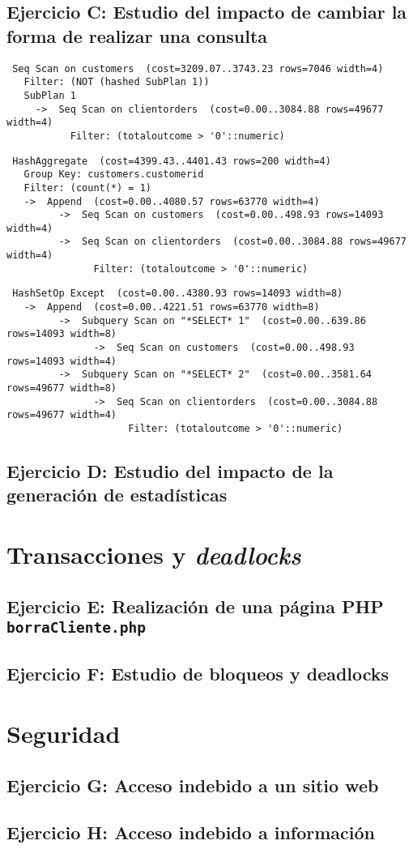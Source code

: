 \documentclass{article}
\begin{document}
\subsection{Ejercicio C: {\small Estudio del impacto de cambiar la forma de realizar una consulta}}
\begin{lstlisting}
 Seq Scan on customers  (cost=3209.07..3743.23 rows=7046 width=4)
   Filter: (NOT (hashed SubPlan 1))
   SubPlan 1
     ->  Seq Scan on clientorders  (cost=0.00..3084.88 rows=49677 width=4)
           Filter: (totaloutcome > '0'::numeric)
\end{lstlisting}
\begin{lstlisting}
 HashAggregate  (cost=4399.43..4401.43 rows=200 width=4)
   Group Key: customers.customerid
   Filter: (count(*) = 1)
   ->  Append  (cost=0.00..4080.57 rows=63770 width=4)
         ->  Seq Scan on customers  (cost=0.00..498.93 rows=14093 width=4)
         ->  Seq Scan on clientorders  (cost=0.00..3084.88 rows=49677 width=4)
               Filter: (totaloutcome > '0'::numeric)
\end{lstlisting}
\begin{lstlisting}
 HashSetOp Except  (cost=0.00..4380.93 rows=14093 width=8)
   ->  Append  (cost=0.00..4221.51 rows=63770 width=8)
         ->  Subquery Scan on "*SELECT* 1"  (cost=0.00..639.86 rows=14093 width=8)
               ->  Seq Scan on customers  (cost=0.00..498.93 rows=14093 width=4)
         ->  Subquery Scan on "*SELECT* 2"  (cost=0.00..3581.64 rows=49677 width=8)
               ->  Seq Scan on clientorders  (cost=0.00..3084.88 rows=49677 width=4)
                     Filter: (totaloutcome > '0'::numeric)
\end{lstlisting}
\subsection{Ejercicio D: {\small Estudio del impacto de la generación de estadísticas}}
\section{Transacciones y \textit{deadlocks}}
\subsection{Ejercicio E: {\small Realización de una página PHP \texttt{borraCliente.php}}}
\subsection{Ejercicio F: {\small Estudio de bloqueos y deadlocks}}
\section{Seguridad}
\subsection{Ejercicio G: {\small Acceso indebido a un sitio web}}
\subsection{Ejercicio H: {\small Acceso indebido a información}}
\end{document}
